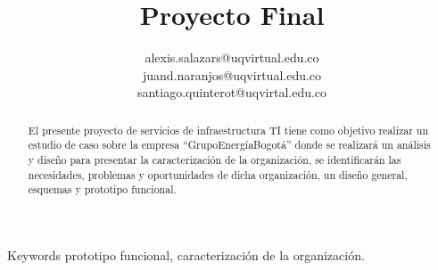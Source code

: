\documentclass[conference,letterpaper]{IEEEtran}
\begin{document}
\title{Proyecto Final\\
}
\author{
alexis.salazars@uqvirtual.edu.co

juand.naranjos@uqvirtual.edu.co

santiago.quinterot@uqvirtal.edu.co
}
\maketitle
\begin{abstract}
El presente proyecto de servicios de infraestructura TI tiene como objetivo realizar un estudio de caso sobre la empresa “GrupoEnergíaBogotá” donde se realizará un análisis y diseño para presentar la caracterización de la organización, se identificarán las necesidades, problemas y oportunidades de dicha organización, un diseño general, esquemas y prototipo funcional.

\end{abstract}

\begin{IEEEkeywords}
Keywords prototipo funcional, caracterización de la organización.
\end{IEEEkeywords}
\end{document}
